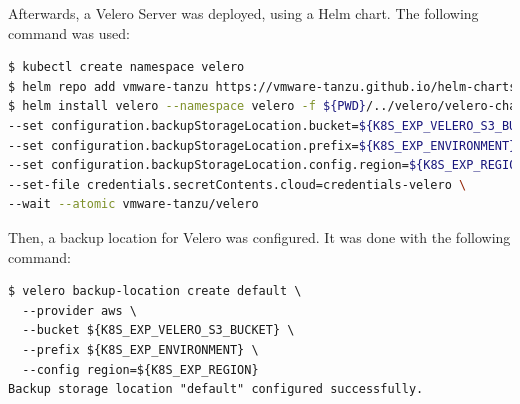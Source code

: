 Afterwards, a Velero Server was deployed, using a Helm chart. The following command was used:

\begin{lstlisting}[basicstyle=\tiny,caption={Deploying a Velero Helm chart},captionpos=b,language=Bash,xleftmargin=1cm]
$ kubectl create namespace velero
$ helm repo add vmware-tanzu https://vmware-tanzu.github.io/helm-charts
$ helm install velero --namespace velero -f ${PWD}/../velero/velero-chart-values.yaml \
--set configuration.backupStorageLocation.bucket=${K8S_EXP_VELERO_S3_BUCKET} \
--set configuration.backupStorageLocation.prefix=${K8S_EXP_ENVIRONMENT} \
--set configuration.backupStorageLocation.config.region=${K8S_EXP_REGION} \
--set-file credentials.secretContents.cloud=credentials-velero \
--wait --atomic vmware-tanzu/velero
\end{lstlisting}

Then, a backup location for Velero was configured. It was done with the following command:
\begin{lstlisting}[basicstyle=\tiny,caption={Choosing a backup storage location for Velero}]
$ velero backup-location create default \
  --provider aws \
  --bucket ${K8S_EXP_VELERO_S3_BUCKET} \
  --prefix ${K8S_EXP_ENVIRONMENT} \
  --config region=${K8S_EXP_REGION}
Backup storage location "default" configured successfully.
\end{lstlisting}

